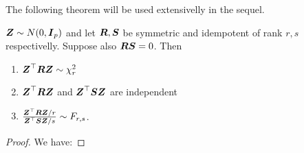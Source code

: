 The following theorem will be used extensivelly in the sequel. 
\begin{theorem}
    $\boldsymbol{Z}\sim N(0, \boldsymbol{I}_p)$ and let $\boldsymbol{R}, \boldsymbol{S}$ be symmetric and idempotent of rank $r, s$ respectivelly. Suppose also $\boldsymbol{RS}=0$. Then 
    \begin{enumerate}
        \item $\boldsymbol{Z}^\top \boldsymbol{R} \boldsymbol{Z} \sim \chi^2_r$
        \item $\boldsymbol{Z}^\top \boldsymbol{R} \boldsymbol{Z}$ and $\boldsymbol{Z}^\top \boldsymbol{S} \boldsymbol{Z}$ are independent
        \item $\frac{\boldsymbol{Z}^\top \boldsymbol{R} \boldsymbol{Z} / r}{\boldsymbol{Z}^\top \boldsymbol{S} \boldsymbol{Z}/s} \sim F_{r,s}$.
    \end{enumerate}
\end{theorem}
\begin{proof} We have: 
\end{proof}